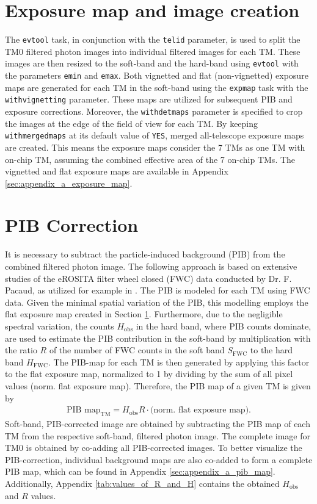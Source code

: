 \section{Exposure map and image creation}\label{sec:exposure_map}
The \texttt{evtool} task, in conjunction with the \texttt{telid} parameter, is used to split the TM0 filtered photon images into individual filtered images for each TM. These images are then resized to the soft-band and the hard-band using \texttt{evtool} with the parameters \texttt{emin} and \texttt{emax}. Both vignetted and flat (non-vignetted) exposure maps are generated for each TM in the soft-band using the \texttt{expmap} task with the \texttt{withvignetting} parameter. These maps are utilized for subsequent PIB and exposure corrections. Moreover, the \texttt{withdetmaps} parameter is specified to crop the images at the edge of the field of view for each TM. By keeping \texttt{withmergedmaps} at its default value of \texttt{YES}, merged all-telescope exposure maps are created. This means the exposure maps consider the 7 TMs as one TM with on-chip TM, assuming the combined effective area of the 7 on-chip TMs. The vignetted and flat exposure maps are available in Appendix \ref{sec:appendix_a_exposure_map}.
\section{PIB Correction}\label{sec:pib_correction}
It is necessary to subtract the particle-induced background (PIB) from the combined filtered photon image. The following  approach is based on extensive studies of the eROSITA filter wheel closed (FWC) data conducted by Dr. F. Pacaud, as utilized for example in \citet{Reiprich2021}. The PIB is modeled for each TM using FWC data. Given the minimal spatial variation of the PIB, this modelling employs the flat exposure map created in Section \ref{sec:exposure_map}. Furthermore, due to the negligible spectral variation, the counts \(H_\text{obs}\) in the hard band, where PIB counts dominate, are used to estimate the PIB contribution in the soft-band by multiplication with the ratio \(R\) of the number of FWC counts in the soft band \(S_{\text{FWC}}\) to the hard band \(H_\text{FWC}\). The PIB-map for each TM is then generated by applying this factor to the flat exposure map, normalized to 1 by dividing by the sum of all pixel values (norm. flat exposure map). Therefore, the PIB map of a given TM is given by
\begin{align*}
    \text{PIB map}_\text{TM} = H_\text{obs}R\cdot\bigl(\text{norm. flat exposure map}\bigr).
\end{align*}
Soft-band, PIB-corrected image are obtained by subtracting the PIB map of each TM from the respective soft-band, filtered photon image. The complete image for TM0 is obtained by co-adding all PIB-corrected images. To better visualize the PIB-correction, individual background maps are also co-added to form a complete PIB map, which can be found in Appendix \ref{sec:appendix_a_pib_map}. Additionally, Appendix \ref{tab:values_of_R_and_H} contains the obtained \(H_\text{obs}\) and \(R\) values.
%
